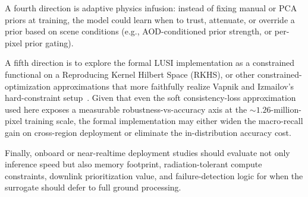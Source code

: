 \documentclass[preprint,12pt]{elsarticle}
\begin{document}
A fourth direction is adaptive physics infusion: instead of fixing manual or PCA priors at training, the model could learn when to trust, attenuate, or override a prior based on scene conditions (e.g., AOD-conditioned prior strength, or per-pixel prior gating).

A fifth direction is to explore the formal LUSI implementation as a constrained functional on a Reproducing Kernel Hilbert Space (RKHS), or other constrained-optimization approximations that more faithfully realize Vapnik and Izmailov's hard-constraint setup~\cite{vapnik2020}.
Given that even the soft consistency-loss approximation used here exposes a measurable robustness-vs-accuracy axis at the $\sim$$1.26$-million-pixel training scale, the formal implementation may either widen the macro-recall gain on cross-region deployment or eliminate the in-distribution accuracy cost.

Finally, onboard or near-realtime deployment studies should evaluate not only inference speed but also memory footprint, radiation-tolerant compute constraints, downlink prioritization value, and failure-detection logic for when the surrogate should defer to full ground processing.



\end{document}
